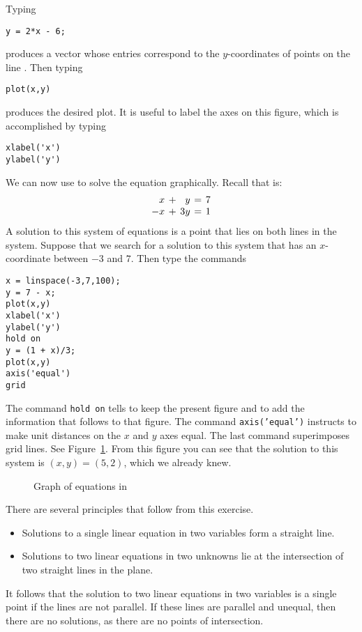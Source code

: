 \documentclass{ximera}
\begin{document}
Typing
\begin{verbatim}
y = 2*x - 6;
\end{verbatim}
produces a vector whose entries correspond to the
$y$-coordinates of points on the line .  Then typing
\begin{verbatim}
plot(x,y)
\end{verbatim}
produces the desired plot.  It is useful to label the axes on
this figure, which is accomplished by typing
\begin{verbatim}
xlabel('x')
ylabel('y')
\end{verbatim} 

We can now use \Matlab to solve the equation 
graphically.  Recall that  is:
\[
\arraycolsep 2pt
\begin{array}{rcrcr}
 x & + &  y & = & 7 \\
-x & + & 3y & = & 1
\end{array}
\]
A solution to this system of equations is a point that lies on
both lines in the system.  Suppose that we search for a solution
to this system that has an $x$-coordinate between $-3$ and $7$.
Then type the commands
\begin{verbatim}
x = linspace(-3,7,100);
y = 7 - x;
plot(x,y)
xlabel('x')
ylabel('y')
hold on
y = (1 + x)/3;
plot(x,y)
axis('equal')
grid
\end{verbatim}  
The \Matlab command {\tt hold on} tells \Matlab to keep the
present figure and to add the information that follows to that figure.
The command {\tt axis('equal')} instructs \Matlab to make unit distances
on the $x$ and $y$ axes equal.  The last \Matlab command superimposes
grid lines. See Figure~\ref{lineint}.  From this figure
you can see that the solution to this system is $(x,y)=(5,2)$, which
we already knew.

\begin{figure}[htb]
                       \centerline{%
                       }
                       \caption{Graph of equations in \protect{}}
                       \label{lineint}
\end{figure}


There are several principles that follow from this exercise.
\begin{itemize}
\item   Solutions to a single linear equation in two variables
form a straight line.
\item Solutions to two linear equations in two unknowns lie at
the intersection of two straight lines in the plane.
\end{itemize}
It follows that the solution to two linear equations in two
variables is a single point if the lines are not parallel.  If
these lines are parallel and unequal, then there are no
solutions, as there are no points of intersection.
\end{document}
